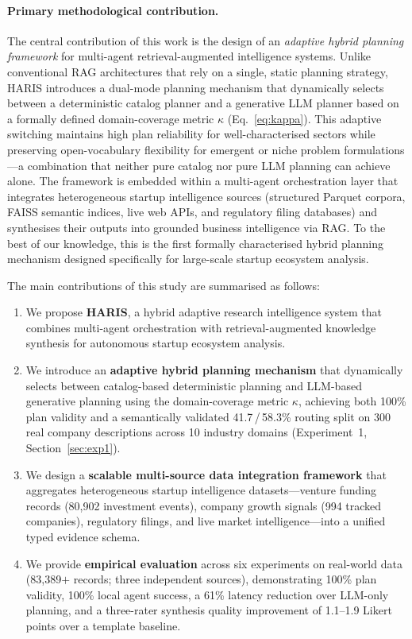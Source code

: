 \documentclass[preprint,12pt]{elsarticle}
\begin{document}
\paragraph{Primary methodological contribution.}
The central contribution of this work is the design of an \emph{adaptive hybrid
planning framework} for multi-agent retrieval-augmented intelligence systems.
Unlike conventional RAG architectures that rely on a single, static planning
strategy, HARIS introduces a dual-mode planning mechanism that dynamically
selects between a deterministic catalog planner and a generative LLM planner
based on a formally defined domain-coverage metric $\kappa$ (Eq.~\ref{eq:kappa}).
This adaptive switching maintains high plan reliability for well-characterised
sectors while preserving open-vocabulary flexibility for emergent or niche
problem formulations---a combination that neither pure catalog nor pure LLM
planning can achieve alone. The framework is embedded within a multi-agent
orchestration layer that integrates heterogeneous startup intelligence sources
(structured Parquet corpora, FAISS semantic indices, live web APIs, and
regulatory filing databases) and synthesises their outputs into grounded
business intelligence via RAG. To the best of our knowledge, this is the first
formally characterised hybrid planning mechanism designed specifically for
large-scale startup ecosystem analysis.

The main contributions of this study are summarised as follows:
\begin{enumerate}[label=(\arabic*)]
  \item We propose \textbf{HARIS}, a hybrid adaptive research intelligence
        system that combines multi-agent orchestration with retrieval-augmented
        knowledge synthesis for autonomous startup ecosystem analysis.
  \item We introduce an \textbf{adaptive hybrid planning mechanism} that
        dynamically selects between catalog-based deterministic planning and
        LLM-based generative planning using the domain-coverage metric $\kappa$,
        achieving both 100\% plan validity and a semantically validated
        41.7\,/\,58.3\% routing split on 300 real company descriptions across
        10 industry domains (Experiment~1, Section~\ref{sec:exp1}).
  \item We design a \textbf{scalable multi-source data integration framework}
        that aggregates heterogeneous startup intelligence datasets---venture
        funding records (80,902 investment events), company growth signals
        (994 tracked companies), regulatory filings, and live market
        intelligence---into a unified typed evidence schema.
  \item We provide \textbf{empirical evaluation} across six experiments on
        real-world data (83,389$+$ records; three independent sources),
        demonstrating 100\% plan validity, 100\% local agent success, a 61\%
        latency reduction over LLM-only planning, and a three-rater synthesis
        quality improvement of 1.1--1.9 Likert points over a template baseline.
\end{enumerate}
\end{document}
